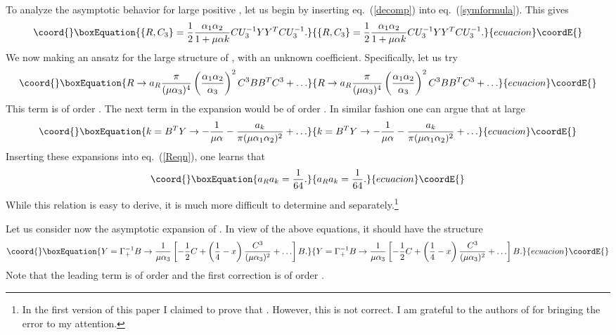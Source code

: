 \documentclass[a4paper,12pt]{article}
\begin{document}
To analyze the asymptotic behavior for large positive \myHighlight{$\mu$}\coordHE{}, let
us begin by inserting eq.~(\ref{decomp}) into
eq.~(\ref{symformula}). This gives
\begin{equation}\coord{}\boxEquation{ \label{Reqn}
\{R,C_3\} = {1\over 2} {\alpha_1\alpha_2 \over 1 + \mu \alpha k}
CU_3^{-1} Y Y^T CU_3^{-1}.
}{ \{R,C_3\} = {1\over 2} {\alpha_1\alpha_2 \over 1 + \mu \alpha k}
CU_3^{-1} Y Y^T CU_3^{-1}.
}{ecuacion}\coordE{}\end{equation}
We now making an ansatz for the large \myHighlight{$\mu$}\coordHE{} structure of \coordHE{}, with
an unknown coefficient. Specifically, let us try
\begin{equation}\coord{}\boxEquation{
R \to a_R {\pi \over (\mu \alpha_3)^4} \left( {\alpha_1 \alpha_2
\over \alpha_3}\right)^2 {C^3}B B^T {C^3} + \ldots
}{
R \to a_R {\pi \over (\mu \alpha_3)^4} \left( {\alpha_1 \alpha_2
\over \alpha_3}\right)^2 {C^3}B B^T {C^3} + \ldots
}{ecuacion}\coordE{}\end{equation}
This term is of order \coordHE{}. The next term in the expansion
would be of order \coordHE{}. In similar fashion one can argue
that at large \myHighlight{$\mu$}\coordHE{}
\begin{equation}\coord{}\boxEquation{
k =B^T Y \to - {1 \over \mu \alpha}  - {a_k \over \pi (\mu
\alpha_1 \alpha_2)^2} +\ldots
}{
k =B^T Y \to - {1 \over \mu \alpha}  - {a_k \over \pi (\mu
\alpha_1 \alpha_2)^2} +\ldots
}{ecuacion}\coordE{}\end{equation}
Inserting these expansions into eq.~(\ref{Reqn}), one learns that
\begin{equation}\coord{}\boxEquation{
a_R a_k = {1 \over 64}.
}{
a_R a_k = {1 \over 64}.
}{ecuacion}\coordE{}\end{equation}
While this relation is easy to derive, it is much more difficult
to determine \coordHE{} and \coordHE{} separately.\footnote{In the first
version of this paper I claimed to prove that \coordHE{}.
However, this is not correct. I am grateful to the authors of
\cite{Klebanov:2002mp} for bringing the error to my attention.}

Let us consider now the asymptotic expansion of \coordHE{}. In view of
the above equations, it should have the structure
\begin{equation}\coord{}\boxEquation{\label{Yasym}
Y = \Gamma_+^{-1} B \to {1 \over \mu \alpha_3} \left[ - {1\over 2}
C + \left( {1 \over 4} - x\right) {C^3 \over (\mu \alpha_3)^2} +
\ldots \right] B.
}{Y = \Gamma_+^{-1} B \to {1 \over \mu \alpha_3} \left[ - {1\over 2}
C + \left( {1 \over 4} - x\right) {C^3 \over (\mu \alpha_3)^2} +
\ldots \right] B.
}{ecuacion}\coordE{}\end{equation}
Note that the leading term is of order \coordHE{} and the first
correction is of order \coordHE{}.
\end{document}
